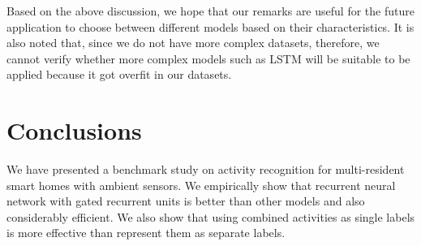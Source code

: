 Based on the above discussion, we hope that our remarks are useful for the future application to choose between different models based on their characteristics. It is also noted that, since we do not have more complex datasets, therefore, we cannot verify whether more complex models such as LSTM will be suitable to be applied because it got overfit in our datasets.

\section{Conclusions}
We have presented a benchmark study on activity recognition for multi-resident smart homes with ambient sensors. We empirically show that recurrent neural network with gated recurrent units is better than other models and also considerably efficient. We also show that using combined activities as single labels is more effective than represent them as separate labels.
\label{sec:concl}





%
%



